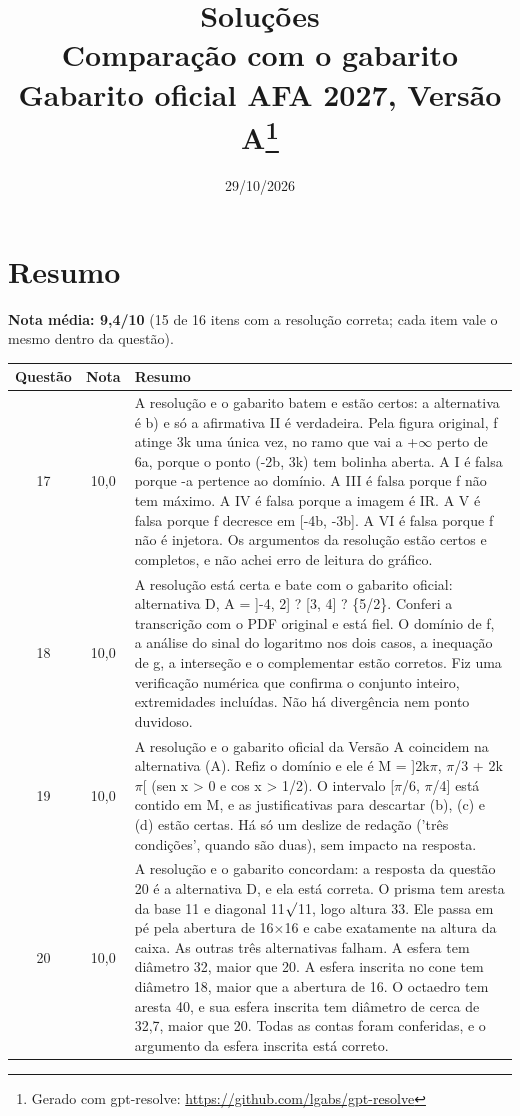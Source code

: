 \documentclass{article}%
\title{Soluções\\[4pt]\large Comparação com o gabarito Gabarito oficial AFA 2027, Versão A\thanks{Gerado com gpt-resolve: \url{https://github.com/lgabs/gpt-resolve}}}%
\date{29/10/2026}%
\begin{document}
%
\normalsize%
\maketitle%
\section*{Resumo}\textbf{Nota média: 9,4/10} (15 de 16 itens com a resolução correta; cada item vale o mesmo dentro da questão).\par\medskip%
\begin{longtable}{@{}c c p{}@{}}\toprule Questão & Nota & Resumo \\ \midrule
17 & 10,0 & A resolução e o gabarito batem e estão certos: a alternativa é b) e só a afirmativa II é verdadeira. Pela figura original, f atinge 3k uma única vez, no ramo que vai a +$\infty$ perto de 6a, porque o ponto (-2b, 3k) tem bolinha aberta. A I é falsa porque -a pertence ao domínio. A III é falsa porque f não tem máximo. A IV é falsa porque a imagem é IR. A V é falsa porque f decresce em {[}-4b, -3b{]}. A VI é falsa porque f não é injetora. Os argumentos da resolução estão certos e completos, e não achei erro de leitura do gráfico. \\
18 & 10,0 & A resolução está certa e bate com o gabarito oficial: alternativa D, A = {]}-4, 2{]} ? {[}3, 4{]} ? \{5/2\}. Conferi a transcrição com o PDF original e está fiel. O domínio de f, a análise do sinal do logaritmo nos dois casos, a inequação de g, a interseção e o complementar estão corretos. Fiz uma verificação numérica que confirma o conjunto inteiro, extremidades incluídas. Não há divergência nem ponto duvidoso. \\
19 & 10,0 & A resolução e o gabarito oficial da Versão A coincidem na alternativa (A). Refiz o domínio e ele é M = {]}2k$\pi$, $\pi$/3 + 2k$\pi${[} (sen x > 0 e cos x > 1/2). O intervalo {[}$\pi$/6, $\pi$/4{]} está contido em M, e as justificativas para descartar (b), (c) e (d) estão certas. Há só um deslize de redação ('três condições', quando são duas), sem impacto na resposta. \\
20 & 10,0 & A resolução e o gabarito concordam: a resposta da questão 20 é a alternativa D, e ela está correta. O prisma tem aresta da base 11 e diagonal 11$\surd$11, logo altura 33. Ele passa em pé pela abertura de 16$\times$16 e cabe exatamente na altura da caixa. As outras três alternativas falham. A esfera tem diâmetro 32, maior que 20. A esfera inscrita no cone tem diâmetro 18, maior que a abertura de 16. O octaedro tem aresta 40, e sua esfera inscrita tem diâmetro de cerca de 32,7, maior que 20. Todas as contas foram conferidas, e o argumento da esfera inscrita está correto. \\

\end{longtable}
\end{document}

